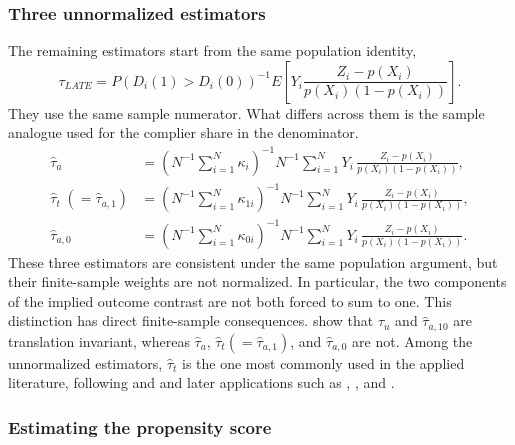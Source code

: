\documentclass{article}
\begin{document}
\subsubsection*{Three unnormalized estimators}
The remaining estimators start from the same population identity,
\[
\tau_{LATE}
= P(D_i(1)>D_i(0))^{-1}
E\!\left[
Y_i\frac{Z_i-p(X_i)}{p(X_i)(1-p(X_i))}
\right].
\]
They use the same sample numerator. What differs across them is the sample
analogue used for the complier share in the denominator.
\begin{align}
    \hat\tau_a &= \left(N^{-1}\sum_{i=1}^N \kappa_i\right)^{-1} N^{-1}\sum_{i=1}^N Y_i\,\frac{Z_i-p(X_i)}{p(X_i)(1-p(X_i))}, \label{eq:tau_a}\\
    \hat\tau_t \;(=\hat\tau_{a,1}) &= \left(N^{-1}\sum_{i=1}^N \kappa_{1i}\right)^{-1} N^{-1}\sum_{i=1}^N Y_i\,\frac{Z_i-p(X_i)}{p(X_i)(1-p(X_i))}, \label{eq:tau_t}\\
    \hat\tau_{a,0} &= \left(N^{-1}\sum_{i=1}^N \kappa_{0i}\right)^{-1} N^{-1}\sum_{i=1}^N Y_i\,\frac{Z_i-p(X_i)}{p(X_i)(1-p(X_i))}. \label{eq:tau_a0}
\end{align}
These three estimators are consistent under the same population argument, but
their finite-sample weights are not normalized. In particular, the two components
of the implied outcome contrast are not both forced to sum to one. This
distinction has direct finite-sample consequences. \citet{sloczynski2025abadie}
show that
$\hat\tau_u$ and $\hat\tau_{a,10}$ are translation invariant, whereas
$\hat\tau_a$, $\hat\tau_t(=\hat\tau_{a,1})$, and $\hat\tau_{a,0}$ are not.
Among the unnormalized estimators, $\hat\tau_t$ is the one most commonly used in
the applied literature, following \citet{tan2006regression} and
\citet{frolich2007nonparametric} and later applications such as
\citet{macurdy2011flexible},
\citet{donald2014inverse,donald2014testing}, and
\citet{abdulkadirouglu2017research}.

\subsubsection*{Estimating the propensity score}
\end{document}
